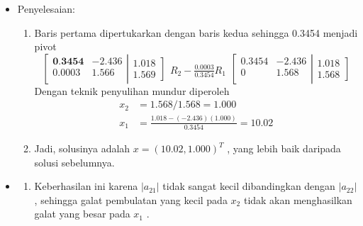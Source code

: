 \documentclass[pdflatex,compress,mathserif]{beamer}
\begin{document}
\begin{frame}
	\begin{itemize}
		\item Penyelesaian:
		\begin{enumerate}
			\item Baris pertama dipertukarkan dengan baris kedua sehingga 0.3454 menjadi pivot
			\[
			\left[
				\begin{matrix}
					\textbf{0.3454} & -2.436 \\
					0.0003 & 1.566 \\
				\end{matrix}
			\right|			
			\left.
				\begin{matrix}
					1.018 \\ 1.569 
				\end{matrix}
			\right]
			\begin{matrix}
				\\
				R_2 - \frac{0.0003}{0.3454}R_1
			\end{matrix}
			\left[
				\begin{matrix}
					0.3454 & -2.436 \\
					0 & 1.568 \\
				\end{matrix}
			\right|			
			\left.
				\begin{matrix}
					1.018 \\ 1.568 
				\end{matrix}
			\right]
			\]
			Dengan teknik penyulihan mundur diperoleh
			\begin{align*}
				x_2 &= 1.568 / 1.568 = 1.000 \\
				x_1 &= \frac{1.018-(-2.436)(1.000)}{0 . 3454} = 10.02
			\end{align*}
			\item[] Jadi, solusinya adalah $ x = (10.02, 1.000)^T $ , yang lebih baik daripada solusi sebelumnya.
		\end{enumerate}
	\end{itemize}
\end{frame}

\begin{frame}
	\begin{itemize}
		\item[]
		\begin{enumerate}
			\item[] Keberhasilan ini karena $ | a_{21} | $ tidak sangat kecil dibandingkan dengan $ | a_{22} | $, sehingga galat pembulatan yang kecil pada $ x_2 $ tidak akan menghasilkan galat yang besar pada $ x_1 $ .
		\end{enumerate}
	\end{itemize}
\end{frame}
\end{document}
